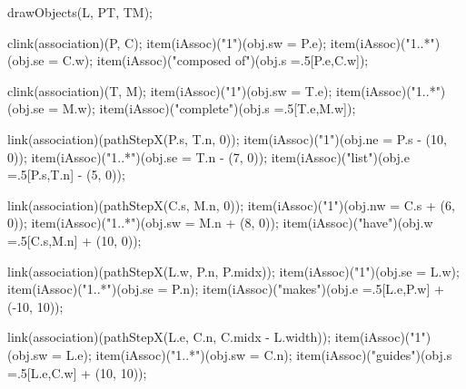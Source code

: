 \begin{empfile}
\begin{empdef}[erdiag]
drawObjects(L, PT, TM);

clink(association)(P, C);
item(iAssoc)("1")(obj.sw = P.e);
item(iAssoc)("1..*")(obj.se = C.w);
item(iAssoc)("composed of")(obj.s =.5[P.e,C.w]);

clink(association)(T, M);
item(iAssoc)("1")(obj.sw = T.e);
item(iAssoc)("1..*")(obj.se = M.w);
item(iAssoc)("complete")(obj.s =.5[T.e,M.w]);

link(association)(pathStepX(P.s, T.n, 0));
item(iAssoc)("1")(obj.ne = P.s - (10, 0));
item(iAssoc)("1..*")(obj.se = T.n - (7, 0));
item(iAssoc)("list")(obj.e =.5[P.s,T.n] - (5, 0));

link(association)(pathStepX(C.s, M.n, 0));
item(iAssoc)("1")(obj.nw = C.s + (6, 0));
item(iAssoc)("1..*")(obj.sw = M.n + (8, 0));
item(iAssoc)("have")(obj.w =.5[C.s,M.n] + (10, 0));

link(association)(pathStepX(L.w, P.n, P.midx));
item(iAssoc)("1")(obj.se = L.w);
item(iAssoc)("1..*")(obj.se = P.n);
item(iAssoc)("makes")(obj.e =.5[L.e,P.w] + (-10, 10));

link(association)(pathStepX(L.e, C.n, C.midx - L.width));
item(iAssoc)("1")(obj.sw = L.e);
item(iAssoc)("1..*")(obj.sw = C.n);
item(iAssoc)("guides")(obj.s =.5[L.e,C.w] + (10, 10));

\end{empdef}

\end{empfile}
